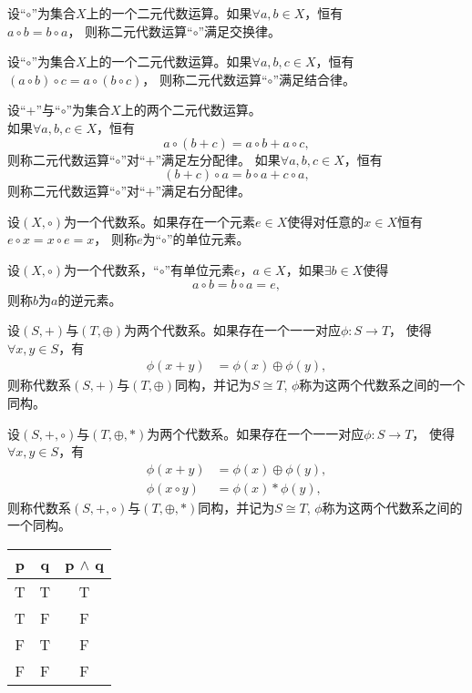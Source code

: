   \begin{Def}
    设“$\circ$”为集合$X$上的一个二元代数运算。如果$\forall a, b \in X$，恒有\\$a \circ b = b \circ a$， 则称二元代数运算“$\circ$”满足交换律。
  \end{Def}
  \begin{Def}
    设“$\circ$”为集合$X$上的一个二元代数运算。如果$\forall a, b, c \in X$，恒有$(a \circ b) \circ c = a \circ (b \circ c)$， 则称二元代数运算“$\circ$”满足结合律。
  \end{Def}
  \begin{Def}
    设“+”与“$\circ$”为集合$X$上的两个二元代数运算。\\如果$\forall a, b, c \in X$，恒有\[a \circ (b + c) = a \circ b + a \circ c,\] 则称二元代数运算“$\circ$”对“$+$”满足左分配律。
    如果$\forall a, b, c \in X$，恒有\[(b + c)\circ a = b \circ a + c \circ a,\] 则称二元代数运算“$\circ$”对“$+$”满足右分配律。
  \end{Def}
  \begin{Def}
    设$(X, \circ)$为一个代数系。如果存在一个元素$e\in X$使得对任意的$x\in X$恒有$e\circ x = x \circ e = x$， 则称$e$为“$\circ$”的单位元素。
  \end{Def}
  \begin{Def}
    设$(X, \circ)$为一个代数系，“$\circ$”有单位元素$e$，$a\in X$，如果$\exists b\in X$使得\[a\circ b = b \circ a = e,\]  则称$b$为$a$的逆元素。
  \end{Def}
  \begin{Def}
    设$(S,+)$与$(T, \oplus)$为两个代数系。如果存在一个一一对应$\phi:S\to T$， 使得$\forall x, y \in S$，有
    \begin{align*}
      \phi(x+y) &= \phi(x) \oplus \phi(y),
    \end{align*}
    则称代数系$(S,+)$与$(T, \oplus)$同构，并记为$S\cong T$, $\phi$称为这两个代数系之间的一个同构。
  \end{Def}
  \begin{Def}
    设$(S,+, \circ)$与$(T, \oplus, *)$为两个代数系。如果存在一个一一对应$\phi:S\to T$， 使得$\forall x, y \in S$，有
    \begin{align*}
      \phi(x+y) &= \phi(x) \oplus \phi(y),\\
      \phi(x\circ y)&= \phi(x) * \phi(y),
    \end{align*}
    则称代数系$(S,+,\circ)$与$(T, \oplus, *)$同构，并记为$S\cong T$, $\phi$称为这两个代数系之间的一个同构。
  \end{Def}
  \begin{tabular}{cc|c}
    p& q& p $\land$ q\\
    \hline
    T&T&T\\
    T&F&F\\
    F&T&F\\
    F&F&F\\
  \end{tabular}\hspace{1cm}
